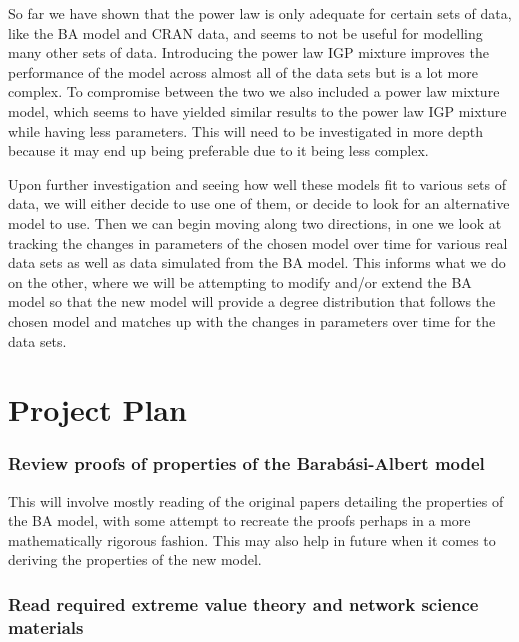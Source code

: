 \documentclass[
]{article}
\begin{document}
So far we have shown that the power law is only adequate for certain
sets of data, like the BA model and CRAN data, and seems to not be
useful for modelling many other sets of data. Introducing the power law
IGP mixture improves the performance of the model across almost all of
the data sets but is a lot more complex. To compromise between the two
we also included a power law mixture model, which seems to have yielded
similar results to the power law IGP mixture while having less
parameters. This will need to be investigated in more depth because it
may end up being preferable due to it being less complex.

Upon further investigation and seeing how well these models fit to
various sets of data, we will either decide to use one of them, or
decide to look for an alternative model to use. Then we can begin moving
along two directions, in one we look at tracking the changes in
parameters of the chosen model over time for various real data sets as
well as data simulated from the BA model. This informs what we do on the
other, where we will be attempting to modify and/or extend the BA model
so that the new model will provide a degree distribution that follows
the chosen model and matches up with the changes in parameters over time
for the data sets.

\newpage{}

\hypertarget{project-plan}{%
\section{Project Plan}\label{project-plan}}

\hypertarget{review-proofs-of-properties-of-the-barabuxe1si-albert-model}{%
\subsubsection*{Review proofs of properties of the Barabási-Albert
model}\label{review-proofs-of-properties-of-the-barabuxe1si-albert-model}}

This will involve mostly reading of the original papers detailing the
properties of the BA model, with some attempt to recreate the proofs
perhaps in a more mathematically rigorous fashion. This may also help in
future when it comes to deriving the properties of the new model.

\hypertarget{read-required-extreme-value-theory-and-network-science-materials}{%
\subsubsection*{Read required extreme value theory and network science
materials}\label{read-required-extreme-value-theory-and-network-science-materials}}
\end{document}
